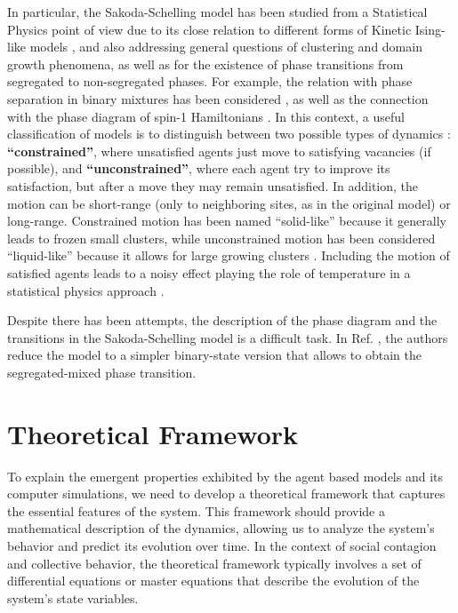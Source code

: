 In particular, the Sakoda-Schelling model has been studied from a Statistical Physics point of view due to its close relation to different forms of Kinetic Ising-like models \cite{stauffer-2007,stauffer-2013}, and also addressing general questions of clustering and domain growth phenomena, as well as for the existence of phase transitions from segregated to non-segregated phases. For example, the relation with phase separation in binary mixtures has been considered \cite{Dall_Asta_2008,Vinkovic}, as well as the connection with the phase diagram of spin-1 Hamiltonians \cite{BEG,BlumeCapel,Gauvin_2009,Gauvin_2010}. In this context, a useful classification of models is to distinguish between two possible types of dynamics \cite{Dall_Asta_2008}: \textbf{``constrained''}, where unsatisfied agents just move to satisfying vacancies (if possible), and \textbf{``unconstrained''},  where each agent try to improve its satisfaction, but after a move they may remain unsatisfied. In addition, the motion can be short-range (only to neighboring sites, as in the original model) or long-range. Constrained motion has been named ``solid-like'' because it generally leads to frozen small clusters, while unconstrained motion has been considered ``liquid-like'' because it allows for large growing clusters \cite{Vinkovic}. Including the motion of satisfied agents leads to a noisy effect playing the role of temperature in a statistical physics approach \cite{Gauvin_2009,Gauvin_2010}.

Despite there has been attempts, the description of the phase diagram and the transitions in the Sakoda-Schelling model is a difficult task. In Ref. \cite{lucquiaud2022modeliser}, the authors reduce the model to a simpler binary-state version that allows to obtain the segregated-mixed phase transition.

\section{\label{sec:Theoretical Framework} Theoretical Framework}

To explain the emergent properties exhibited by the agent based models and its computer simulations, we need to develop a theoretical framework that captures the essential features of the system. This framework should provide a mathematical description of the dynamics, allowing us to analyze the system's behavior and predict its evolution over time. In the context of social contagion and collective behavior, the theoretical framework typically involves a set of differential equations or master equations that describe the evolution of the system's state variables.

